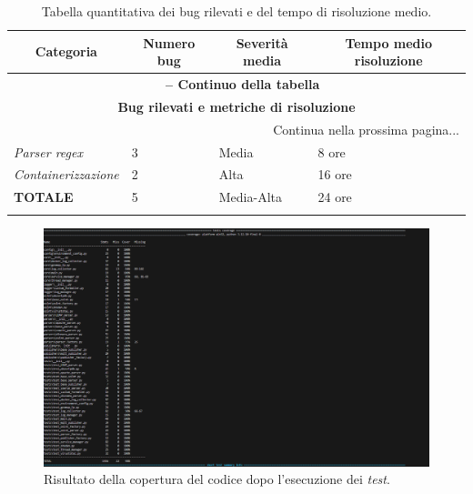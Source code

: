 \begin{center}
\begin{longtable}{|p{}|p{}|p{}|p{}|}
\hline
\multicolumn{1}{|c|}{\textbf{Categoria}} & 
\multicolumn{1}{c|}{\textbf{Numero bug}} & 
\multicolumn{1}{c|}{\textbf{Severità media}} & 
\multicolumn{1}{c|}{\textbf{Tempo medio risoluzione}} \\ 
\hline
\endfirsthead

\multicolumn{4}{c}{{\bfseries \tablename\ \thetable{} -- Continuo della tabella}}\\
\hline
\multicolumn{4}{|c|}{\textbf{Bug rilevati e metriche di risoluzione}} \\ \hline
\endhead

\hline \multicolumn{4}{|r|}{{Continua nella prossima pagina...}} \\ \hline
\endfoot

\endlastfoot

\textit{Parser regex} & 3 & Media & 8 ore \\ \hline
\textit{Containerizzazione} & 2 & Alta & 16 ore \\ \hline
\textbf{TOTALE} & 5 & Media-Alta & 24 ore \\ \hline

\caption{Tabella quantitativa dei bug rilevati e del tempo di risoluzione medio.}
\label{tab:bug-metriche}
\end{longtable}
\end{center}


\begin{figure}[H]
    \begin{center}
    \includegraphics[width=\textwidth]{img/code-coverage.png}
    \caption{Risultato della copertura del codice dopo l'esecuzione dei \textit{test}.}
    \label{fig:coverage}
    \end{center}
\end{figure}
